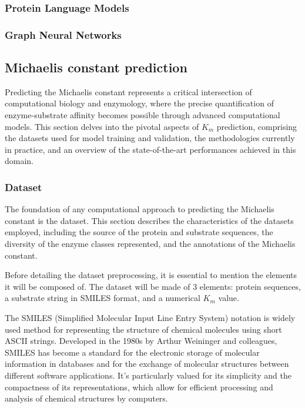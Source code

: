 \subsubsection{Protein Language Models}
\subsubsection{Graph Neural Networks}

\subsection{Michaelis constant prediction}

Predicting the Michaelis constant represents a critical intersection of computational biology 
and enzymology, where the precise quantification of enzyme-substrate affinity becomes possible 
through advanced computational models. This section delves into the pivotal aspects of $K_m$
prediction, comprising the datasets used for model training and validation, 
the methodologies currently in practice, and an overview of the state-of-the-art performances achieved 
in this domain. 
\subsubsection{Dataset}
\label{sec:dataset}
The foundation of any computational approach to predicting the Michaelis constant is the dataset. 
This section describes the characteristics of the datasets employed, including the source of the 
protein and substrate sequences, the diversity of the enzyme classes represented, and the annotations of 
the Michaelis constant.

Before detailing the dataset preprocessing, it is essential to mention the elements it will be composed of.
The dataset will be made of 3 elements: protein sequences, a substrate string in SMILES format, and a
numerical $K_m$ value.

The SMILES (Simplified Molecular Input Line Entry System) notation is widely used method for 
representing the structure of chemical molecules using short ASCII strings. \cite{smiles}
Developed in the 1980s by Arthur Weininger and colleagues, SMILES has become a standard for the 
electronic storage of molecular information in databases and for the exchange of molecular structures 
between different software applications. It's particularly valued for its simplicity and the 
compactness of its representations, which allow for efficient processing and analysis of chemical 
structures by computers.

